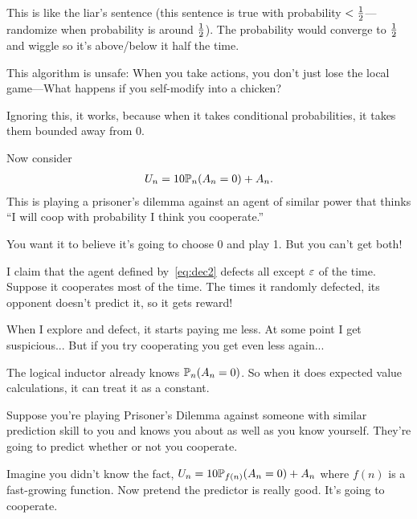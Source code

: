 \documentclass[11pt]{article}
\begin{document}
This is like the liar's sentence (this sentence is true with probability $<\frac{1}{2}$---randomize when probability is around $\frac{1}{2}$). %
The probability would converge to $\frac{1}{2}$ and wiggle so it's above/below it half the time.

This algorithm is unsafe: When you take actions, you don't just lose the local game---What happens if you self-modify into a chicken?

Ignoring this, it works, because when it takes conditional probabilities, it takes them bounded away from 0.

Now consider 
\begin{align}\label{eq:dt-pd}
U_n = 10\mathbb{P}_n(A_n=0)+A_n.
\end{align} %
This is %
playing a prisoner's dilemma against an agent of similar power that thinks ``I will coop with probability I think you cooperate.''

You want it to believe it's going to choose 0 and play 1. But you can't get both!


I claim that the agent defined by~\eqref{eq:dec2} defects all except $\varepsilon$ of the time.
Suppose it cooperates most of the time. 
The times it randomly defected, its opponent doesn't predict it, so it gets reward!

When I explore and defect, it starts paying me less. At some point I get suspicious... But if you try cooperating you get even less again...

The logical inductor already knows $\mathbb{P}_n(A_n=0)$. So when it does expected value calculations, it can treat it as a constant.


Suppose you're playing Prisoner's Dilemma against someone with similar prediction skill to you and knows you about as well as you know yourself. They're going to predict whether or not you cooperate.


Imagine you didn't know the fact, $U_n=10\mathbb{P}_{f(n)}(A_n=0)+A_n$ where $f(n)$ is a fast-growing function. Now pretend the predictor is really good. It's going to cooperate.
\end{document}
